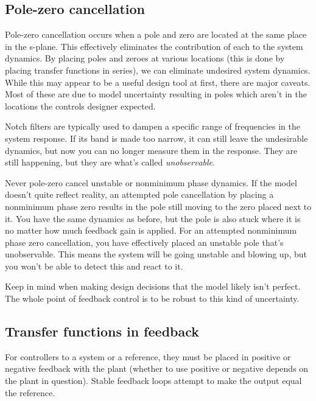 \subsection{Pole-zero cancellation}

Pole-zero cancellation occurs when a pole and zero are located at the same place
in the s-plane. This effectively eliminates the contribution of each to the
\gls{system} dynamics. By placing poles and zeroes at various locations (this is
done by placing transfer functions in series), we can eliminate undesired
\gls{system} dynamics. While this may appear to be a useful design tool at
first, there are major caveats. Most of these are due to \gls{model} uncertainty
resulting in poles which aren't in the locations the controls designer expected.

Notch filters are typically used to dampen a specific range of frequencies in
the \gls{system response}. If its band is made too narrow, it can still leave the
undesirable dynamics, but now you can no longer measure them in the response.
They are still happening, but they are what's called \textit{unobservable}.

Never pole-zero cancel unstable or nonminimum phase dynamics. If the \gls{model}
doesn't quite reflect reality, an attempted pole cancellation by placing a
nonminimum phase zero results in the pole still moving to the zero placed next
to it. You have the same dynamics as before, but the pole is also stuck where it
is no matter how much \gls{feedback gain} is applied. For an attempted
nonminimum phase zero cancellation, you have effectively placed an unstable pole
that's unobservable. This means the \gls{system} will be going unstable and
blowing up, but you won't be able to detect this and react to it.

Keep in mind when making design decisions that the \gls{model} likely isn't
perfect. The whole point of feedback control is to be robust to this kind of
uncertainty.

\subsection{Transfer functions in feedback}

For \glspl{controller} to  a \gls{system} or
 a reference, they must be placed in positive or
negative feedback with the \gls{plant} (whether to use positive or negative
depends on the \gls{plant} in question). Stable feedback loops attempt to make
the \gls{output} equal the \gls{reference}.

